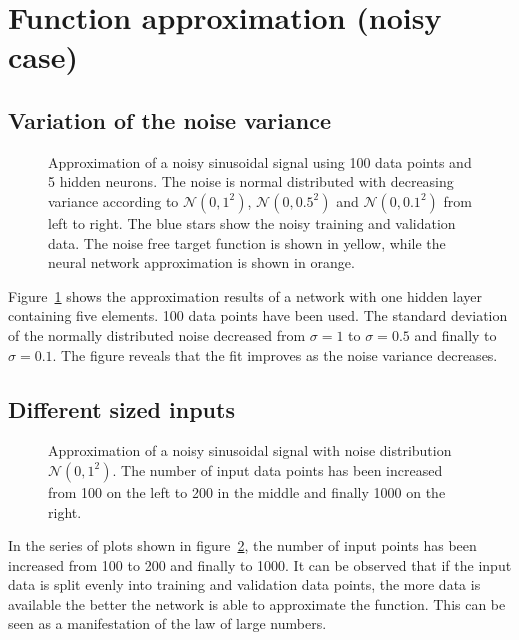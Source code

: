 \section{Function approximation (noisy case)}
\subsection{Variation of the noise variance}
\begin{figure}



\caption{Approximation of a noisy sinusoidal signal using 100 data points and 5 hidden neurons. The noise is normal distributed with decreasing variance according to $\mathcal{N}(0,1^2)$, $\mathcal{N}(0,0.5^2)$ and $\mathcal{N}(0,0.1^2)$ from left to right. The blue stars show the noisy training and validation data. The noise free target function is shown in yellow, while the neural network approximation is shown in orange.}
\label{fig:noisyCase1}
\end{figure}
Figure~\ref{fig:noisyCase1} shows the approximation results of a network with one hidden layer containing five elements. 100 data points have been used. The standard deviation of the normally distributed noise decreased from $\sigma = 1$ to $\sigma = 0.5$ and finally to $\sigma = 0.1$. The figure reveals that the fit improves as the noise variance decreases. 

\subsection{Different sized inputs}
\begin{figure}



\caption{Approximation of a noisy sinusoidal signal with noise distribution $\mathcal{N}(0,1^2)$. The number of input data points has been increased from 100 on the left to 200 in the middle and finally 1000 on the right.}
\label{fig:noisyCase2}
\end{figure}
In the series of plots shown in figure~\ref{fig:noisyCase2}, the number of input points has been increased from 100 to 200 and finally to 1000. It can be observed that if the input data is split evenly into training and validation data points, the more data is available the better the network is able to approximate the function. This can be seen as a manifestation of the law of large numbers.
